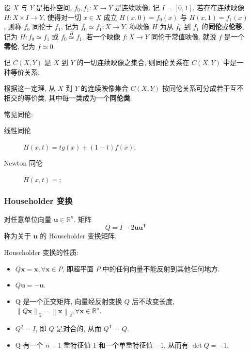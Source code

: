 \begin{definition}
  设 \(X\) 与 \(Y\) 是拓扑空间, \(f_0,f_1:X\to Y\) 是连续映像. 记 \(I=[0,1]\). 若存在连续映像 \(H:X\times I\to Y\), 使得对一切 \(x\in X\) 成立 \(H(x,0)=f_0(x)\) 与 \(H(x,1)=f_1(x)\), 则称 \(f_0\) 同伦于 \(f_1\), 记为 \(f_0\simeq f_1:X\to Y\). 称映像 \(H\) 为从 \(f_0\) 到 \(f_1\) 的\textbf{同伦}或\textbf{伦移}, 记为 \(H:f_0\simeq f_1\) 或 \(f_0 \overset{H}{\simeq} f_1\). 若一个映像 \(f:X\to Y\) 同伦于常值映像, 就说 \(f\) 是一个\textbf{零伦}, 记为 \(f\simeq 0\).
\end{definition}

\begin{theorem}
  记 \(C(X,Y)\) 是 \(X\) 到 \(Y\) 的一切连续映像之集合, 则同伦关系在 \(C(X,Y)\) 中是一种等价关系.
\end{theorem}

根据这一定理, 从 \(X\) 到 \(Y\) 的连续映像集合 \(C(X,Y)\) 按同伦关系可分成若干互不相交的等价类, 其中每一类成为一个\textbf{同伦类}.

常见同伦:
\begin{description}
  \item[线性同伦] \(H(x,t)=tg(x)+(1-t)f(x)\);
  \item[Newton 同伦] \(H(x,t)=\);
\end{description}

\subsubsection{Householder 变换}

\begin{definition}
  对任意单位向量 \(\boldsymbol{u}\in\mathbb{R}^n\), 矩阵
  \begin{equation*}
    Q=I-2\boldsymbol{u}\boldsymbol{u}^\mathrm{T}
  \end{equation*}
  称为关于 \(\boldsymbol{u}\) 的 Householder 变换矩阵.
\end{definition}

Householder 变换的性质:

\begin{itemize}
  \item \(Q\boldsymbol{x}=\boldsymbol{x},\forall\boldsymbol{x}\in P\), 即超平面 \(P\) 中的任何向量不能反射到其他任何地方.
  \item \(Q\boldsymbol{u}=-\boldsymbol{u}\).
  \item Q 是一个正交矩阵, 向量经反射变换 \(Q\) 后不改变长度, \(\left\lVert Q\boldsymbol{x}\right\rVert_2=\left\lVert \boldsymbol{x}\right\rVert_2,\forall\boldsymbol{x}\in\mathbb{R}^n\).
  \item \(Q^2=I\), 即 \(Q\) 是对合的, 从而 \(Q^\mathrm{T}=Q\).
  \item Q 有一个 \(n-1\) 重特征值 \(1\) 和一个单重特征值 \(-1\), 从而有 \(\det Q=-1\).
\end{itemize}

